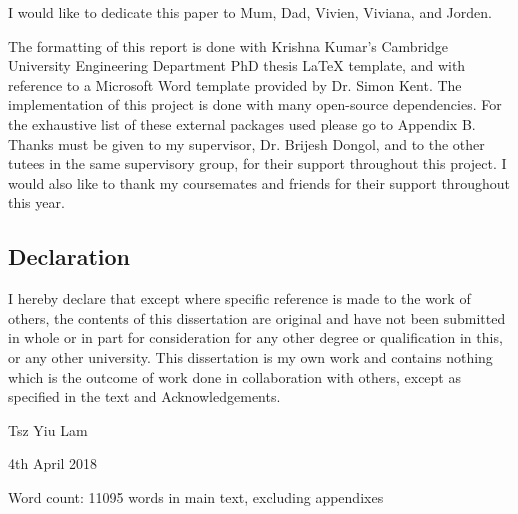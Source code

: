 
\begin{acknowledgements}      

\begin{center}
I would like to dedicate this paper to Mum, Dad, Vivien, Viviana, and Jorden.\\
\end{center}

The formatting of this report is done with Krishna Kumar's Cambridge University Engineering Department PhD thesis 
LaTeX template, and with reference to a Microsoft Word template provided by Dr. Simon Kent. 
The implementation of this project is done with many open-source dependencies.
For the exhaustive list of these external packages used please go to Appendix B.\\

Thanks must be given to my supervisor, Dr. Brijesh Dongol, and to the other tutees in the same supervisory group, 
for their support throughout this project. I would also like to thank my coursemates and friends for their 
support throughout this year.\\

\begin{center}
\section*{Declaration}
\end{center}
\vspace{1cm}
I hereby declare that except where specific reference is made to the work of 
others, the contents of this dissertation are original and have not been 
submitted in whole or in part for consideration for any other degree or 
qualification in this, or any other university. This dissertation is my own 
work and contains nothing which is the outcome of work done in collaboration 
with others, except as specified in the text and Acknowledgements.

\begin{flushright}
Tsz Yiu Lam

4th April 2018
\end{flushright}
\vspace{1cm}
\begin{center}
Word count: 11095 words in main text, excluding appendixes
\end{center}
\end{acknowledgements}
